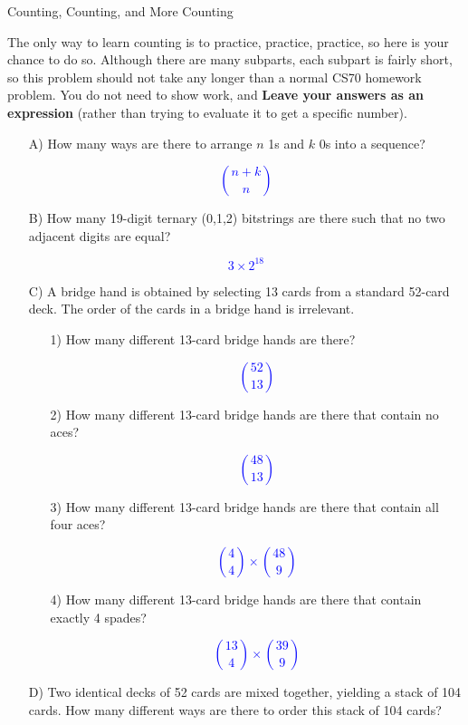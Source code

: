 \begin{homeworkProblem}{Counting, Counting, and More Counting}

The only way to learn counting is to practice, practice, practice, so
here is your chance to do so. Although there are many subparts, each 
subpart is fairly short, so this problem should not take any longer 
than a normal CS70 homework problem. You do not need to show work, and
\textbf{Leave your answers as an expression} (rather than trying to 
evaluate it to get a specific number).
\begin{itemize}

\item[A)] How many ways are there to arrange $n$ 1s and $k$ 0s into a 
sequence?

\textcolor{blue}{\[ \binom{n+k}{n} \]}

\item[B)] How many 19-digit ternary (0,1,2) bitstrings are there such 
that no two adjacent digits are equal?

\textcolor{blue}{\[ 3 \times 2^{18} \]}

\item[C)] A bridge hand is obtained by selecting 13 cards from a 
standard 52-card deck. The order of the cards in a bridge hand is 
irrelevant.
  \begin{itemize}
    \item[1)] How many different 13-card bridge hands are there? 
    
    \textcolor{blue}{\[ \binom{52}{13} \]}

    \item[2)] How many different 13-card bridge hands are there that 
    contain no aces? 

    \textcolor{blue}{\[ \binom{48}{13} \]}

    \item[3)] How many different 13-card bridge hands are there that 
    contain all four aces? 

    \textcolor{blue}{\[ \binom{4}{4} \times \binom{48}{9} \]}

    \item[4)] How many different 13-card bridge hands are there that 
    contain exactly 4 spades?

    \textcolor{blue}{\[ \binom{13}{4} \times \binom{39}{9} \]}

  \end{itemize}

\item[D)] Two identical decks of 52 cards are mixed together, yielding 
a stack of 104 cards. How many different ways are there to order this 
stack of 104 cards?


\end{itemize}
\end{homeworkProblem}
